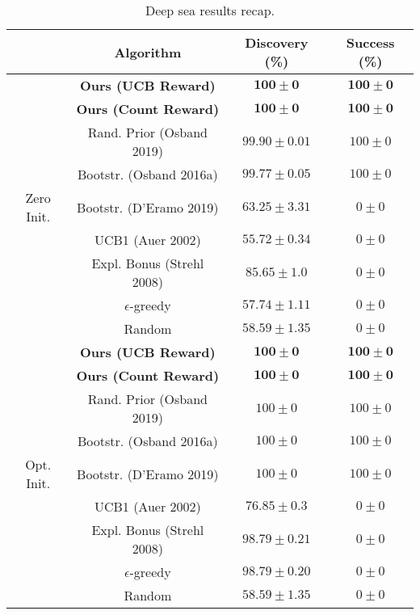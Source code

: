 \documentclass{article}
\begin{document}
\begin{table}[h]
	\centering
	\caption{Deep sea results recap.}
	\begin{tabular}{ c | c | c c }
		& Algorithm & Discovery (\%) & Success (\%) \\
		\hline
		& \textbf{Ours (UCB Reward)} & $\mathbf{100 \pm 0}$ & $\mathbf{100 \pm 0}$ \\
		& \textbf{Ours (Count Reward)} & $\mathbf{100 \pm 0}$ & $\mathbf{100 \pm 0}$ \\
		& Rand. Prior (Osband 2019) & $99.90 \pm 0.01$ & $100 \pm 0$ \\
		& Bootstr. (Osband 2016a) & $99.77 \pm 0.05$ & $100 \pm 0$ \\
		Zero Init. & Bootstr. (D'Eramo 2019) & $63.25 \pm 3.31$ & $0 \pm 0$ \\
		& UCB1 (Auer 2002) & $55.72 \pm 0.34$ & $0 \pm 0$ \\
		& Expl. Bonus (Strehl 2008) & $85.65 \pm 1.0$ & $0 \pm 0$ \\
		& $\epsilon$-greedy & $57.74 \pm 1.11$ & $0 \pm 0$ \\
		& Random & $58.59 \pm 1.35$ & $0 \pm 0$ \\
		\hline
		& \textbf{Ours (UCB Reward)} & $\mathbf{100 \pm 0}$ & $\mathbf{100 \pm 0}$\\
		& \textbf{Ours (Count Reward)} & $\mathbf{100 \pm 0}$ & $\mathbf{100 \pm 0}$ \\
		& Rand. Prior (Osband 2019) & ${100 \pm 0}$ & ${100 \pm 0}$ \\
		& Bootstr. (Osband 2016a) & ${100 \pm 0}$ & ${100 \pm 0}$ \\
		Opt. Init. & Bootstr. (D'Eramo 2019) & ${100 \pm 0}$ & ${100 \pm 0}$ \\
		& UCB1 (Auer 2002) & $76.85 \pm 0.3$ & $0 \pm 0$ \\
		& Expl. Bonus (Strehl 2008) & $98.79 \pm 0.21$ & $0 \pm 0$ \\
		& $\epsilon$-greedy & $98.79 \pm 0.20$ & $0 \pm 0$ \\
		& Random & $58.59 \pm 1.35$ & $0 \pm 0$ \\
	\end{tabular}
\end{table}
\end{document}
